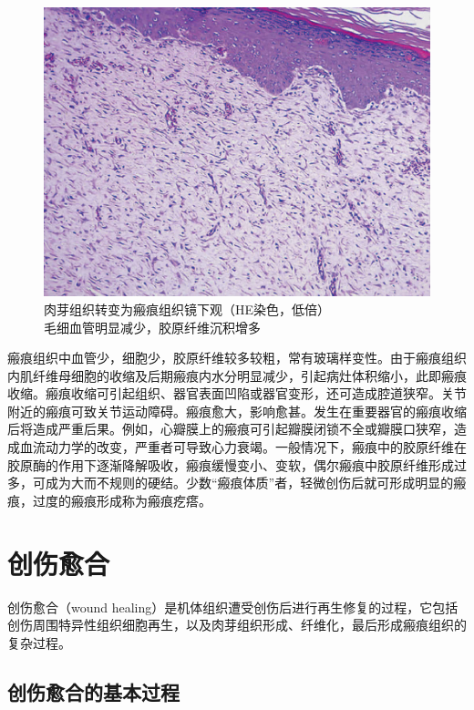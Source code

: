 \begin{figure}[!htbp]
	\centering
    \includegraphics{./images/Image00028.jpg}
	\caption{肉芽组织转变为瘢痕组织镜下观（HE染色，低倍） \\ {\small 毛细血管明显减少，胶原纤维沉积增多}}
	\label{fig2-5} 
	\end{figure} 

瘢痕组织中血管少，细胞少，胶原纤维较多较粗，常有玻璃样变性。由于瘢痕组织内肌纤维母细胞的收缩及后期瘢痕内水分明显减少，引起病灶体积缩小，此即瘢痕收缩。瘢痕收缩可引起组织、器官表面凹陷或器官变形，还可造成腔道狭窄。关节附近的瘢痕可致关节运动障碍。瘢痕愈大，影响愈甚。发生在重要器官的瘢痕收缩后将造成严重后果。例如，心瓣膜上的瘢痕可引起瓣膜闭锁不全或瓣膜口狭窄，造成血流动力学的改变，严重者可导致心力衰竭。一般情况下，瘢痕中的胶原纤维在胶原酶的作用下逐渐降解吸收，瘢痕缓慢变小、变软，偶尔瘢痕中胶原纤维形成过多，可成为大而不规则的硬结。少数``瘢痕体质''者，轻微创伤后就可形成明显的瘢痕，过度的瘢痕形成称为瘢痕疙瘩。

\section{创伤愈合}

创伤愈合（wound
healing）是机体组织遭受创伤后进行再生修复的过程，它包括创伤周围特异性组织细胞再生，以及肉芽组织形成、纤维化，最后形成瘢痕组织的复杂过程。

\subsection{创伤愈合的基本过程}

